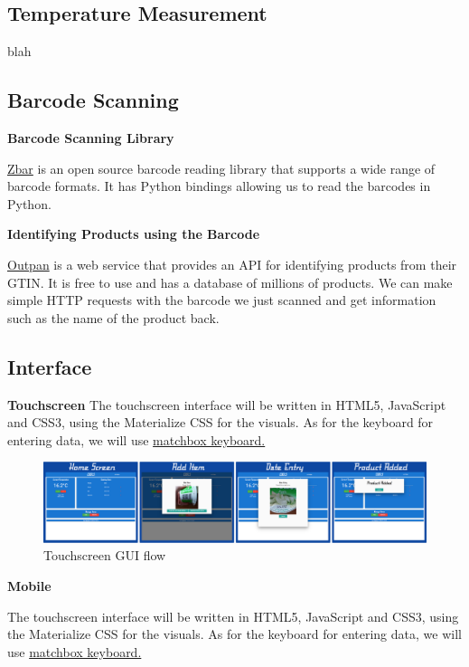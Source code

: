 \documentclass[10pt]{article}
\begin{document}
\subsection{Temperature Measurement}

blah

\subsection{Barcode Scanning}
\textbf{Barcode Scanning Library}

\hyperref[http://zbar.sourceforge.net/]{Zbar} is an open source barcode reading library that supports a wide range of barcode formats. It has Python bindings allowing us to read the barcodes in Python.

\textbf{Identifying Products using the Barcode}

\hyperref[https://www.outpan.com/]{Outpan} is a web service that provides an API for identifying products from their GTIN. It is free to use and has a database of millions of products. We can make simple HTTP requests with the barcode we just scanned and get information such as the name of the product back.

\subsection{Interface}

\textbf{Touchscreen}
The touchscreen interface will be written in HTML5, JavaScript and CSS3, using the Materialize CSS for the visuals. As for the keyboard for entering data, we will use \hyperref[https://github.com/xlab/matchbox-keyboard]{matchbox keyboard.}

\begin{figure}[h]
\centering
\caption{Touchscreen GUI flow}
\label{Touchscreen GUI flow}
\includegraphics[width=18cm]{images/GUI-flow.png}
\end{figure}


\textbf{Mobile}

The touchscreen interface will be written in HTML5, JavaScript and CSS3, using the Materialize CSS for the visuals. As for the keyboard for entering data, we will use \hyperref[https://github.com/xlab/matchbox-keyboard]{matchbox keyboard.}
\end{document}
